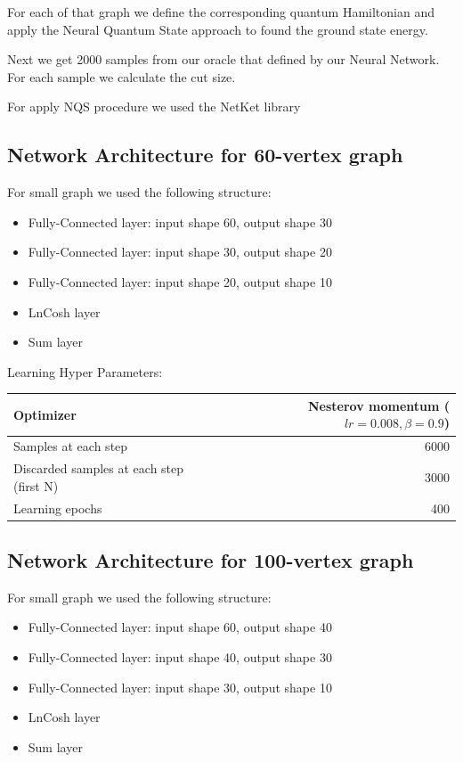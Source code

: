 \documentclass{article}
\begin{document}
For each of that graph we define the corresponding quantum Hamiltonian and apply the Neural Quantum State approach to found the ground state energy.

Next we get 2000 samples from our oracle that defined by our Neural Network. For each sample we calculate the cut size.

For apply NQS procedure we used the NetKet library\cite{netket}

\subsection{Network Architecture for 60-vertex graph}
For small graph we used the following structure:
\begin{itemize}
\item Fully-Connected layer: input shape 60, output shape 30
\item Fully-Connected layer: input shape 30, output shape 20
\item Fully-Connected layer: input shape 20, output shape 10
\item LnCosh layer
\item Sum layer
\end{itemize}


Learning Hyper Parameters:
\begin{center}
\begin{tabular}[center]{| l | r |}
\hline
Optimizer & Nesterov momentum ($lr=0.008, \beta = 0.9$) \\ \hline
Samples at each step & 6000 \\ \hline
Discarded samples at each step (first N) & 3000 \\ \hline
Learning epochs & 400 \\
\hline
\end{tabular}
\end{center}


\subsection{Network Architecture for 100-vertex graph}
For small graph we used the following structure:
\begin{itemize}
\item Fully-Connected layer: input shape 60, output shape 40
\item Fully-Connected layer: input shape 40, output shape 30
\item Fully-Connected layer: input shape 30, output shape 10
\item LnCosh layer
\item Sum layer
\end{itemize}
\end{document}
